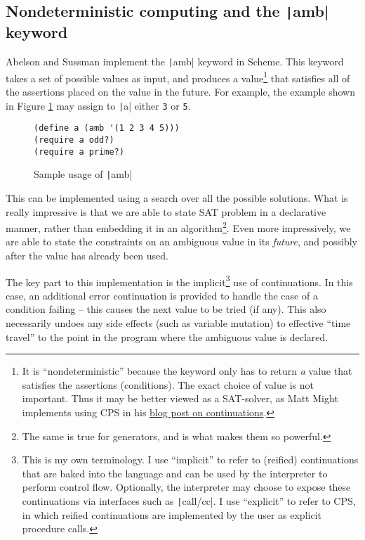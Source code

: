 \documentclass[]{article}
\begin{document}
\subsection{Nondeterministic computing and the \texttt|amb| keyword}
\label{sec:nond}

Abelson and Sussman implement the \texttt|amb| keyword in Scheme. This keyword takes a set of possible values as input, and produces a value\footnote{It is ``nondeterministic'' because the keyword only has to return \textit{a} value that satisfies the assertions (conditions). The exact choice of value is not important. Thus it may be better viewed as a SAT-solver, as Matt Might implements using CPS in his \href{https://matt.might.net/articles/programming-with-continuations--exceptions-backtracking-search-threads-generators-coroutines/}{blog post on continuations}.} that satisfies all of the assertions placed on the value in the future. For example, the example shown in Figure \ref{fig:amb} may assign to \texttt|a| either \texttt{3} or \texttt{5}.

\begin{figure}[h]
  \centering
\begin{verbatim}
(define a (amb '(1 2 3 4 5)))
(require a odd?)
(require a prime?)
\end{verbatim}
  \caption{Sample usage of \texttt|amb|}
  \label{fig:amb}
\end{figure}

This can be implemented using a search over all the possible solutions. What is really impressive is that we are able to state SAT problem in a declarative manner, rather than embedding it in an algorithm\footnote{The same is true for generators, and is what makes them so powerful.}. Even more impressively, we are able to state the constraints on an ambiguous value in its \textit{future}, and possibly after the value has already been used.

The key part to this implementation is the implicit\footnote{This is my own terminology. I use ``implicit'' to refer to (reified) continuations that are baked into the language and can be used by the interpreter to perform control flow. Optionally, the interpreter may choose to expose these continuations via interfaces such as \texttt|call/cc|. I use ``explicit'' to refer to CPS, in which reified continuations are implemented by the user as explicit procedure calls.} use of continuations. In this case, an additional error continuation is provided to handle the case of a condition failing -- this causes the next value to be tried (if any). This also necessarily undoes any side effects (such as variable mutation) to effective ``time travel'' to the point in the program where the ambiguous value is declared.
\end{document}
